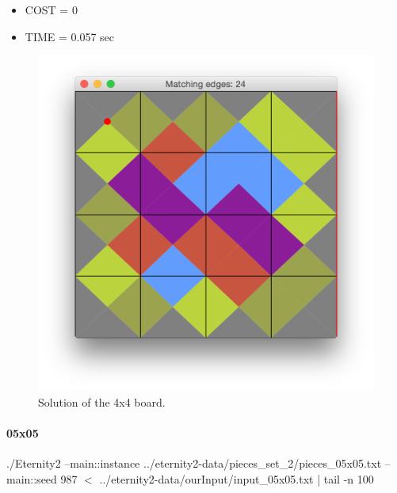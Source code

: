 	\begin{itemize}
		\item COST = 0
		\item TIME = 0.057 sec
	\end{itemize}
	\begin{figure}[H]
	\centering
	\includegraphics[scale=0.25]{img/sol_04x04}
	\caption{Solution of the 4x4 board.}
	\end{figure}



	\paragraph{05x05}
	./Eternity2 --main::instance ../eternity2-data/pieces\_set\_2/pieces\_05x05.txt --main::seed 987 $<$ ../eternity2-data/ourInput/input\_05x05.txt | tail -n 100

